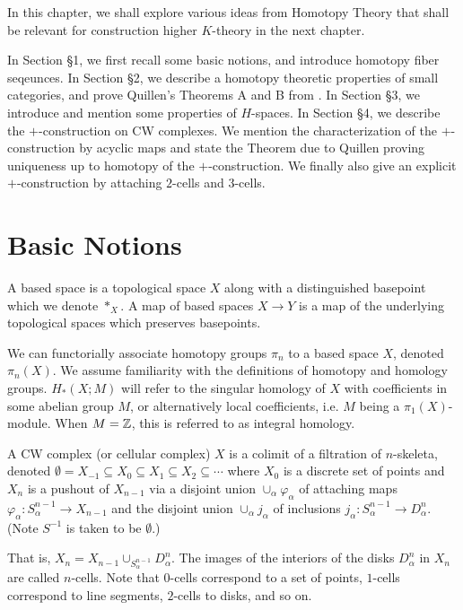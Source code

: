 In this chapter, we shall explore various ideas from Homotopy Theory
that shall be relevant for construction higher $K$-theory in the next chapter.


In Section \S1, we first recall some basic notions, and introduce homotopy fiber seqeunces.
In Section \S2, we describe a homotopy theoretic properties of small categories, and prove Quillen's Theorems A and B from \cite{Quillen}.
In Section \S3, we introduce and mention some properties of $H$-spaces.
In Section \S4, we describe the $+$-construction on CW complexes. We mention the characterization
of the $+$-construction by acyclic maps and state the Theorem due to Quillen proving uniqueness up to homotopy
of the $+$-construction. We finally also give an explicit $+$-construction by attaching $2$-cells and $3$-cells.

\section{Basic Notions}

A based space is a topological space $X$ along with a distinguished basepoint which we denote $*_X$.
A map of based spaces $X \to Y$ is a map of the underlying topological spaces which preserves basepoints.

We can functorially associate homotopy groups $\pi_n$ to a based space $X$, denoted $\pi_n(X)$. We assume familiarity with the definitions of homotopy and homology groups. 
$H_*(X;M)$ will refer to the singular homology of $X$ with coefficients in some abelian group $M$, or alternatively local coefficients, i.e. $M$ being a $\pi_1(X)$-module.
When $M = \mathbb{Z}$, this is referred to as integral homology. 

A CW complex (or cellular complex) $X$ is a colimit of a filtration of $n$-skeleta, denoted $\emptyset = X_{-1} \subseteq X_0 \subseteq X_1 \subseteq X_2 \subseteq \cdots$
where $X_0$ is a discrete set of points and $X_{n}$ is a pushout of $X_{n-1}$ via a disjoint union $\cup_\alpha \varphi_\alpha$ of attaching maps $\varphi_\alpha : S^{n-1}_\alpha \to X_{n-1}$ and
the disjoint union $\cup_\alpha j_\alpha$ of inclusions $j_\alpha : S^{n-1}_\alpha \to D^{n}_\alpha$. (Note $S^{-1}$ is taken to be $\emptyset$.)

That is, $X_{n} = X_{n-1} \cup_{S^{n-1}_\alpha} D^{n}_\alpha$. 
The images of the interiors of the disks $D^n_\alpha$ in $X_n$ are called $n$-cells.
Note that $0$-cells correspond to a set of points, $1$-cells correspond to line segments, $2$-cells to disks, and so on.

